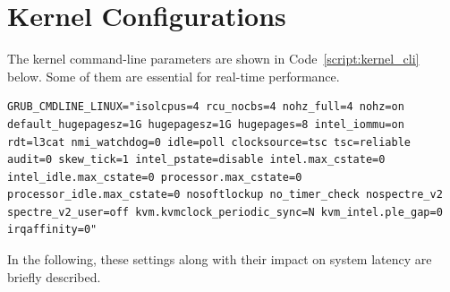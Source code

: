 \documentclass[MMR,Master,english]{twbook}
\begin{document}
\section{Kernel Configurations}\label{sec:kernel_configurations}

The kernel command-line parameters are shown in Code~\ref{script:kernel_cli} below. Some of them are essential for real-time performance.

\vspace{1em}
\begin{minipage}{0.95\columnwidth}
	\begin{lstlisting}[name={Kernel Configuration},label={script:kernel_cli}]
		GRUB_CMDLINE_LINUX="isolcpus=4 rcu_nocbs=4 nohz_full=4 nohz=on default_hugepagesz=1G hugepagesz=1G hugepages=8 intel_iommu=on rdt=l3cat nmi_watchdog=0 idle=poll clocksource=tsc tsc=reliable audit=0 skew_tick=1 intel_pstate=disable intel.max_cstate=0 intel_idle.max_cstate=0 processor.max_cstate=0 processor_idle.max_cstate=0 nosoftlockup no_timer_check nospectre_v2 spectre_v2_user=off kvm.kvmclock_periodic_sync=N kvm_intel.ple_gap=0 irqaffinity=0"
\end{lstlisting}
\end{minipage}

\noindent In the following, these settings along with their impact on system latency are briefly described. 
\end{document}

